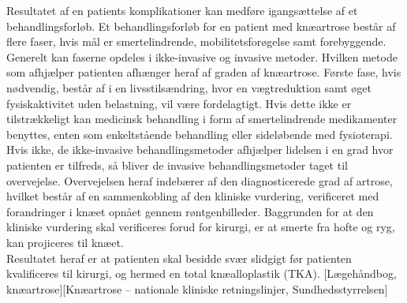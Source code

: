 Resultatet af en patients komplikationer kan medføre igangsættelse af et behandlingsforløb. Et behandlingsforløb for en patient med knæartrose består af flere faser, hvis mål er smertelindrende, mobilitetsforøgelse samt forebyggende. Generelt kan faserne opdeles i ikke-invasive og invasive metoder. Hvilken metode som afhjælper patienten afhænger heraf af graden af knæartrose. Første fase, hvis nødvendig, består af i en livsstilsændring, hvor en vægtreduktion samt øget fysiskaktivitet uden belastning, vil være fordelagtigt. Hvis dette ikke er tilstrækkeligt kan medicinsk behandling i form af smertelindrende medikamenter benyttes, enten som enkeltstående behandling eller sideløbende med fysioterapi. Hvis ikke, de ikke-invasive behandlingsmetoder afhjælper lidelsen i en grad hvor patienten er tilfreds, så bliver de invasive behandlingsmetoder taget til overvejelse. Overvejelsen heraf indebærer af den diagnosticerede grad af artrose, hvilket består af en sammenkobling af den kliniske vurdering, verificeret med forandringer i knæet opnået gennem røntgenbilleder. Baggrunden for at den kliniske vurdering skal verificeres forud for kirurgi, er at smerte fra hofte og ryg, kan projiceres til knæet.\\
Resultatet heraf er at patienten skal besidde svær slidgigt før patienten kvalificeres til kirurgi, og hermed en total knæalloplastik (TKA).  [Lægehåndbog, knæartrose][Knæartrose – nationale kliniske retningslinjer, Sundhedsstyrrelsen]


